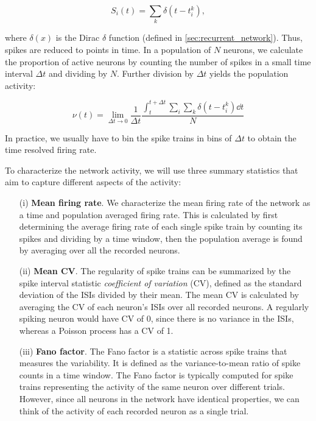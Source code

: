 \begin{equation}
    S_i(t) = \sum_k \delta \left(t - t_i^k \right),
\end{equation}

where $\delta(x)$ is the Dirac $\delta$ function (defined in \cref{sec:recurrent_network}). Thus, spikes are reduced to points in time. In a population of $N$ neurons, we calculate the proportion of active neurons by counting the number of spikes in a small time interval $\Delta t$ and dividing by $N$. Further division by $\Delta t$ yields the population activity:

\begin{equation}
    \nu (t) = \lim_{\Delta t \to 0} \frac{1}{\Delta t} \frac{\int_{t}^{t + \Delta t} \sum_i \sum_k \delta \left(t - t_i^k \right) \dd{t}}{N}
\end{equation} 

In practice, we usually have to bin the spike trains in bins of $\Delta t$ to obtain the time resolved firing rate. 

To characterize the network activity, we will use three summary statistics that aim to capture different aspects of the activity: 
\begin{enumerate}
    \item[(i)] \textbf{Mean firing rate}. We characterize the mean firing rate of the network as a time and population averaged firing rate. This is calculated by first determining the average firing rate of each single spike train by counting its spikes and dividing by a time window, then the population average is found by averaging over all the recorded neurons. 
    \item[(ii)] \textbf{Mean CV}. The regularity of spike trains can be summarized by the spike interval statistic \textit{coefficient of variation} (CV), defined as the standard deviation of the ISIs divided by their mean. The mean CV is calculated by averaging the CV of each neuron's ISIs over all recorded neurons. A regularly spiking neuron would have CV of 0, since there is no variance in the ISIs, whereas a Poisson process has a CV of 1. 
    \item[(iii)] \textbf{Fano factor}. The Fano factor is a statistic across spike trains that measures the variability. It is defined as the variance-to-mean ratio of spike counts in a time window. The Fano factor is typically computed for spike trains representing the activity of the same neuron over different trials. However, since all neurons in the network have identical properties, we can think of the activity of each recorded neuron as a single trial.  
\end{enumerate}


